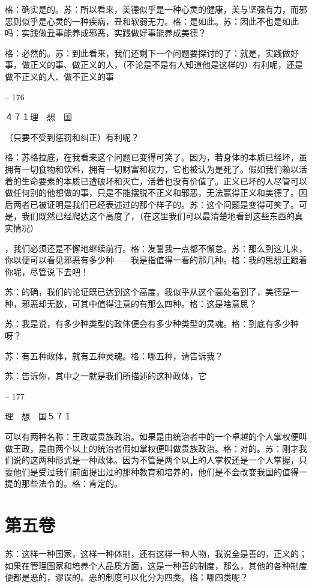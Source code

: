 \documentclass[11pt,oneside]{book}
\begin{document}
\begin{common-format}
    格：确实是的。苏：所以看来，美德似乎是一种心灵的健康，美与坚强有力，而邪恶则似乎是心灵的一种疾病，丑和软弱无力。格：是如此。苏：因此不也是如此吗：实践做丑事能养成邪恶，实践做好事能养成美德？

    格：必然的。苏：到此看来，我们还剩下一个问题要探讨的了：就是，实践做好事，做正义的事、做正义的人，（不论是不是有人知道他是这样的）有利呢，还是做不正义的人、做不正义的事

    

-- 176

    ４７１理　想　国

    （只要不受到惩罚和纠正）有利呢？

    格：苏格拉底，在我看来这个问题已变得可笑了。因为，若身体的本质已经坏，虽拥有一切食物和饮料，拥有一切财富和权力，它也被认为是死了。假如我们赖以活着的生命要素的本质已遭破坏和灭亡，活着也没有价值了。正义已坏的人尽管可以做任何别的他想做的事，只是不能摆脱不正义和邪恶，无法赢得正义和美德了。因后两者已被证明是我们已经表述过的那个样子的。苏：这个问题是变得可笑了。可是，我们既然已经爬达这个高度了，（在这里我们可以最清楚地看到这些东西的真实情况）

    ，我们必须还是不懈地继续前行。格：发誓我一点都不懈怠。苏：那么到这儿来，你以便可以看见邪恶有多少种——我是指值得一看的那几种。格：我的思想正跟着你呢，尽管说下去吧！

    苏：的确，我们的论证既已达到这个高度，我似乎从这个高处看到了，美德是一种，邪恶却无数，可其中值得注意的有那么四种。格：这是啥意思？

    苏：我是说，有多少种类型的政体便会有多少种类型的灵魂。格：到底有多少种呀？

    苏：有五种政体，就有五种灵魂。格：哪五种，请告诉我？

    苏：告诉你，其中之一就是我们所描述的这种政体，它

    

-- 177

    理　想　国５７１

    可以有两种名称：王政或贵族政治。如果是由统治者中的一个卓越的个人掌权便叫做王政，是由两个以上的统治者假如掌权便叫做贵族政治。格：对的。苏：刚才我们说的这两种形式是一种政体。因为不管是两个以上的人掌权还是一个人掌握，只要他们是受过我们前面提出过的那种教育和培养的，他们是不会改变我国的值得一提的那些法令的。格：肯定的。


\chapter{第五卷}
苏：这样一种国家，这样一种体制，还有这样一种人物，我说全是善的，正义的；如果在管理国家和培养个人品质方面，这是一种善的制度，那么，其他的各种制度便都是恶的，谬误的。恶的制度可以化分为四类。格：哪四类呢？


\end{common-format}
\end{document}
